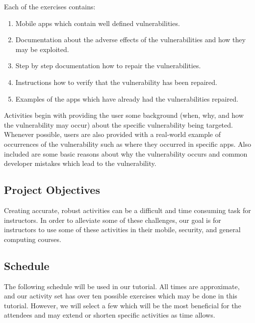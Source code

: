 \documentclass[titlepage]{article}
\begin{document}
\pagebreak
Each of the exercises contains:

\begin{enumerate}
   \setlength{\itemsep}{0pt} %
   \setlength{\parskip}{0pt} %
   \setlength{\parsep}{0pt}  %
    \item Mobile apps which contain well defined vulnerabilities.
    \item Documentation about the adverse effects of the vulnerabilities and how they may be exploited.
    \item Step by step documentation how to repair the vulnerabilities.
    \item Instructions how to verify that the vulnerability has been repaired.
    \item Examples of the apps which have already had the vulnerabilities repaired.
\end{enumerate}

Activities begin with providing the user some background (when, why, and how the vulnerability may occur) about the specific vulnerability being targeted. Whenever possible, users are also provided with a real-world example of occurrences of the vulnerability such as where they occurred in specific apps. Also included are some basic reasons about why the vulnerability occurs and common developer mistakes which lead to the vulnerability.




\subsection{Project Objectives}


Creating accurate, robust activities can be a difficult and time consuming task for instructors. In order to alleviate some of these challenges, our goal is for instructors to use some of these activities in their mobile, security, and general computing courses.


\subsection{Schedule}

The following schedule will be used in our tutorial. All times are approximate, and our activity set has over ten possible exercises which may be done in this tutorial. However, we will select a few which will be the most beneficial for the attendees and may extend or shorten specific activities as time allows.
\end{document}

